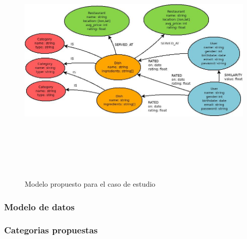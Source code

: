 \newpage
    \begin{landscape}
      \begin{figure}[h!]
      \centering
      \includegraphics[width=22.5cm,height=12cm]{./images/Modelo_datos.jpg}
      \caption{Modelo propuesto para el caso de estudio}
    \end{figure}
    \end{landscape}
  \newpage

\newpage
\subsubsection{Modelo de datos}
   

\newpage
\subsubsection{Categorias propuestas}
   